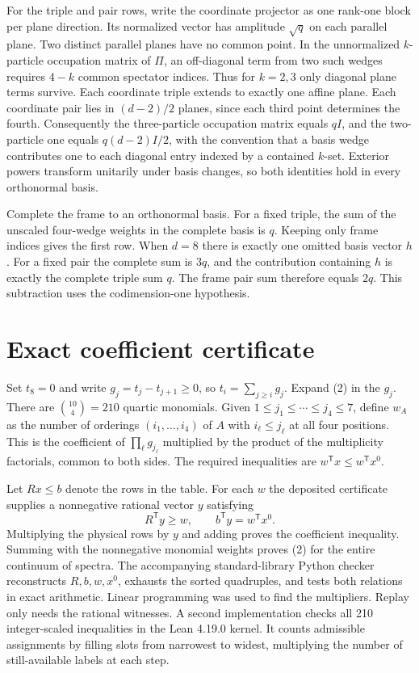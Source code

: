 \documentclass[11pt]{article}
\begin{document}
For the triple and pair rows, write the coordinate projector as one rank-one block per plane direction. Its normalized vector has amplitude $\sqrt q$ on each parallel plane. Two distinct parallel planes have no common point. In the unnormalized $k$-particle occupation matrix of $\Pi$, an off-diagonal term from two such wedges requires $4-k$ common spectator indices. Thus for $k=2,3$ only diagonal plane terms survive. Each coordinate triple extends to exactly one affine plane. Each coordinate pair lies in $(d-2)/2$ planes, since each third point determines the fourth. Consequently the three-particle occupation matrix equals $qI$, and the two-particle one equals $q(d-2)I/2$, with the convention that a basis wedge contributes one to each diagonal entry indexed by a contained $k$-set. Exterior powers transform unitarily under basis changes, so both identities hold in every orthonormal basis.

Complete the frame to an orthonormal basis. For a fixed triple, the sum of the unscaled four-wedge weights in the complete basis is $q$. Keeping only frame indices gives the first row. When $d=8$ there is exactly one omitted basis vector $h$. For a fixed pair the complete sum is $3q$, and the contribution containing $h$ is exactly the complete triple sum $q$. The frame pair sum therefore equals $2q$. This subtraction uses the codimension-one hypothesis.

\section{Exact coefficient certificate}
Set $t_8=0$ and write $g_j=t_j-t_{j+1}\geq0$, so $t_i=\sum_{j\geq i}g_j$. Expand (2) in the $g_j$. There are $\binom{10}{4}=210$ quartic monomials. Given $1\leq j_1\leq\cdots\leq j_4\leq7$, define $w_A$ as the number of orderings $(i_1,\ldots,i_4)$ of $A$ with $i_\ell\leq j_\ell$ at all four positions. This is the coefficient of $\prod_\ell g_{j_\ell}$ multiplied by the product of the multiplicity factorials, common to both sides. The required inequalities are $w^{\mathsf T}x\leq w^{\mathsf T}x^0$.

Let $Rx\leq b$ denote the rows in the table. For each $w$ the deposited certificate supplies a nonnegative rational vector $y$ satisfying
\[
 R^{\mathsf T}y\geq w,\qquad b^{\mathsf T}y=w^{\mathsf T}x^0.
\]
Multiplying the physical rows by $y$ and adding proves the coefficient inequality. Summing with the nonnegative monomial weights proves (2) for the entire continuum of spectra. The accompanying standard-library Python checker reconstructs $R,b,w,x^0$, exhausts the sorted quadruples, and tests both relations in exact arithmetic. Linear programming was used to find the multipliers. Replay only needs the rational witnesses. A second implementation checks all 210 integer-scaled inequalities in the Lean 4.19.0 kernel. It counts admissible assignments by filling slots from narrowest to widest, multiplying the number of still-available labels at each step.
\end{document}
